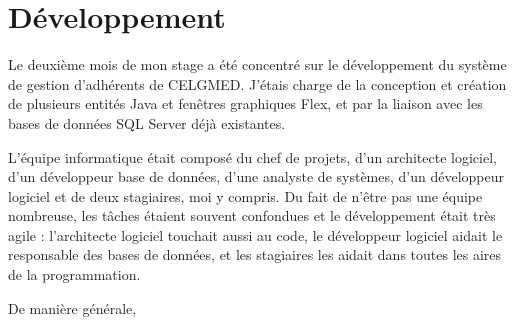 \section{Développement}


Le deuxième mois de mon stage a été concentré sur le développement du système de gestion d'adhérents de CELGMED. J'étais charge de la conception et création de plusieurs entités Java et fenêtres graphiques Flex, et par la liaison avec les bases de données SQL Server déjà existantes.

L'équipe informatique était composé du chef de projets, d'un architecte logiciel, d'un développeur base de données, d'une analyste de systèmes, d'un développeur logiciel et de deux stagiaires, moi y compris. Du fait de n'être pas une équipe nombreuse, les tâches étaient souvent confondues et le développement était très agile : l'architecte logiciel touchait aussi au code, le développeur logiciel aidait le responsable des bases de données, et les stagiaires les aidait dans toutes les aires de la programmation.

De manière générale, 

